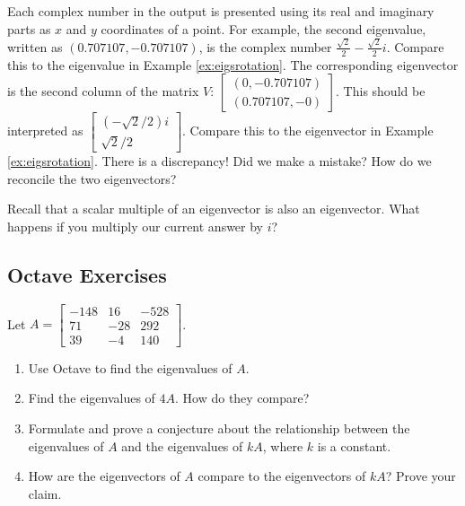 \documentclass{ximera}
\begin{document}
\begin{example}
\begin{explanation}
        Each complex number in the output is presented using its real and imaginary parts as $x$ and $y$ coordinates of a point.  For example, the second eigenvalue, written as $(0.707107,-0.707107)$, is the complex number $\frac{\sqrt{2}}{2}-\frac{\sqrt{2}}{2}i$.  Compare this to the eigenvalue in Example \ref{ex:eigsrotation}.  The corresponding eigenvector is the second column of the matrix $V$: $\begin{bmatrix}(0,-0.707107)\\(0.707107,-0)\end{bmatrix}$.  This should be interpreted as $\begin{bmatrix}(-\sqrt{2}/2)i\\\sqrt{2}/2\end{bmatrix}$.  Compare this to the eigenvector in Example \ref{ex:eigsrotation}.  There is a discrepancy!  Did we make a mistake?  How do we reconcile the two eigenvectors?
        \begin{hint}
            Recall that a scalar multiple of an eigenvector is also an eigenvector.  What happens if you multiply our current answer by $i$?
        \end{hint}
        \end{explanation}
        \end{example}

\subsection*{Octave Exercises}   
\begin{problem}\label{prob_oct_eig0}
    Let $A=\begin{bmatrix}-148 & 16 & -528\\
        71 & -28 & 292\\
        39 & -4 & 140\end{bmatrix}$.  
        \begin{enumerate}
        \item Use Octave to find the eigenvalues of $A$.  
        \item Find the eigenvalues of $4A$.  How do they compare?
        \item Formulate and prove a conjecture about the relationship between the eigenvalues of $A$ and the eigenvalues of $kA$, where $k$ is a constant.
        \item How are the eigenvectors of $A$ compare to the eigenvectors of $kA$?  Prove your claim.
        \end{enumerate}
        
\end{problem}
\end{document}
